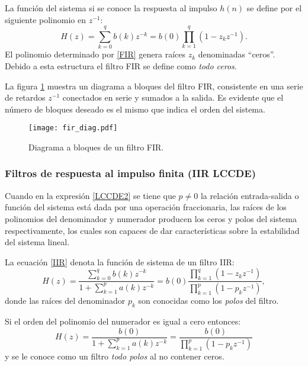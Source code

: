 La función del sistema si se conoce la respuesta al impulso $h(n)$ se define por el siguiente polinomio en $z^{-1}$:
\begin{equation}\label{FIR}
H(z) = \sum_{k=0}^q b(k) z^{-k} = b(0) \prod_{k=1}^q (1-z_kz^{-1}).
\end{equation}
El polinomio determinado por \eqref{FIR} genera raíces $z_{k}$ denominadas ``ceros''. Debido a esta estructura el filtro FIR se define como \emph{todo ceros}.

La figura \ref{FIR_diag} muestra  un diagrama a bloques del filtro FIR, consistente en una serie de retardos $z^{-1}$ conectados en serie y sumados a la salida. Es evidente que el número de bloques deseado es el mismo que indica el orden del sistema.
\begin{figure} [h!]\label{FIR_diag}
  \centering
  \texttt{[image: fir\_diag.pdf]}
  \caption{Diagrama a bloques de un filtro FIR.}
  \label{FIR_diag}
\end{figure}
\subsubsection{Filtros de respuesta al impulso finita (IIR LCCDE)}
Cuando en la expresión \eqref{LCCDE2} se tiene que $p \ne 0$ la relación entrada-salida o función del sistema está dada por una operación fraccionaria, las raíces de los polinomios del denominador y numerador producen los ceros y polos del sistema respectivamente, los cuales son capaces de dar características sobre la estabilidad del sistema lineal. 

La ecuación \eqref{IIR} denota la función de sistema de un filtro IIR:
\begin{equation}\label{IIR}
H(z) =\frac{\displaystyle \sum^{q}_{k=0} b(k)z^{-k}}{\displaystyle 1+\sum_{k=1}^{p} a(k)z^{-k}} = b(0) \frac{\displaystyle \prod_{k=1}^{q} (1-z_k z^{-1})}{\displaystyle \prod_{k=1} ^p (1-p_k z^{-1})},
\end{equation}
donde las raíces del denominador $p_{k}$ son conocidas como los \emph{polos} del filtro.

Si el orden del polinomio del numerador es igual a cero entonces:
\begin{equation}\label{all_pole}
H(z) =\frac{b(0)}{1+\displaystyle \sum_{k=1} ^p a(k)z^{-k}} =  \frac{b(0)}{\displaystyle \prod_{k=1} ^p (1-p_k z^{-1})}
\end{equation}
y se le conoce como un filtro \emph{todo polos} al no contener ceros.

